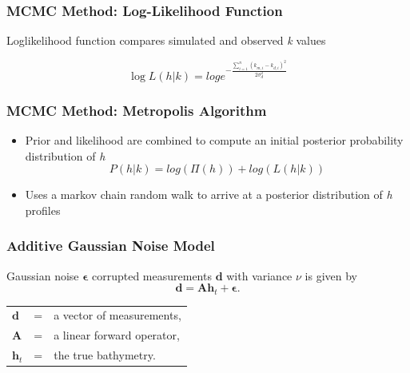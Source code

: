\documentclass[7pt]{beamer}
\begin{document}
\begin{frame}
 \frametitle{MCMC Method: Log-Likelihood Function}
 Loglikelihood function compares simulated and observed \textit{k} values

\begin{equation} \label{likely}
\log{L(h|%
k)}=log{e^{- \frac{\sum\limits_{i=1}^n({k}_{m,i}-k_{d,i})^2}{2\sigma_{d}^2}}}
\end{equation} 


\end{frame}

\begin{frame}
 \frametitle{MCMC Method: Metropolis Algorithm}
\begin{itemize}
\item Prior and likelihood are combined to compute an initial posterior probability distribution of \textit{h}\\
\begin{equation}\label{post}
P(h|%
k) = log(\Pi(h)) + log(L(h|%
k))
\end{equation}
\item Uses a markov chain random walk to %
arrive at a posterior distribution of \textit{h} profiles %
\end{itemize}
\end{frame}

 \begin{frame}
\frametitle{Additive Gaussian Noise Model}

Gaussian noise $\boldsymbol{\epsilon}$ corrupted measurements $\mathbf{d}$ with variance $\nu$ is given by 
$$
\mathbf{d} = \mathbf{A} \mathbf{h}_t + \boldsymbol{\epsilon}.
$$

\begin{tabular}{l c l}
$\mathbf{d}$ &=& a vector of measurements,\\
$\mathbf{A}$ &=& a linear forward operator,\\
$\mathbf{h}_t$ &=& the true bathymetry. 
\end{tabular}

\end{frame}
\end{document}
